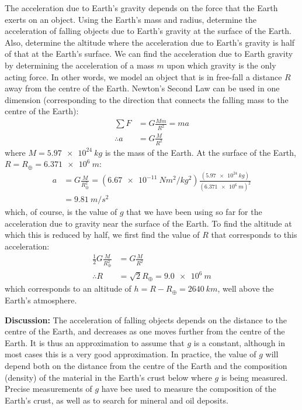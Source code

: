 \begin{example}{\label{ex:gravity:gofr}The acceleration due to Earth's gravity depends on the force that the Earth exerts on an object. Using the Earth's mass and radius, determine the acceleration of falling objects due to Earth's gravity at the surface of the Earth. Also, determine the altitude where the acceleration due to Earth's gravity is half of that at the Earth's surface.}
We can find the acceleration due to Earth gravity by determining the acceleration of a mass $m$ upon which gravity is the only acting force. In other words, we model an object that is in free-fall a distance $R$ away from the centre of the Earth. Newton's Second Law can be used in one dimension (corresponding to the direction that connects the falling mass to the centre of the Earth):
\begin{align*}
\sum F &= G\frac{Mm}{R^2}=ma\\
\therefore a&=G\frac{M}{R^2}
\end{align*}
where $M=\SI{5.97e24}{kg}$ is the mass of the Earth. At the surface of the Earth, $R=R_\oplus=\SI{6.371e6}{m}$:
\begin{align*}
a&=G\frac{M}{R_\oplus^2}=(\SI{6.67e-11}{Nm^2/kg^2})\frac{(\SI{5.97e24}{kg})}{(\SI{6.371e6}{m})^2}\\
&=\SI{9.81}{m/s^2}
\end{align*}
which, of course, is the value of $g$ that we have been using so far for the acceleration due to gravity near the surface of the Earth. To find the altitude at which this is reduced by half, we first find the value of $R$ that corresponds to this acceleration:
\begin{align*}
\frac{1}{2}G\frac{M}{R_\oplus^2}&=G\frac{M}{R^2}\\
\therefore R &=\sqrt{2}R_\oplus = \SI{9.0e6}{m}
\end{align*}
which corresponds to an altitude of $h=R-R_\oplus=\SI{2640}{km}$, well above the Earth's atmosphere.

\textbf{Discussion:} The acceleration of falling objects depends on the distance to the centre of the Earth, and decreases as one moves further from the centre of the Earth. It is thus an approximation to assume that $g$ is a constant, although in most cases this is a very good approximation. In practice, the value of $g$ will depend both on the distance from the centre of the Earth and the composition (density) of the material in the Earth's crust below where $g$ is being measured. Precise measurements of $g$ have bee used to measure the composition of the Earth's crust, as well as to search for mineral and oil deposits.
\end{example}

